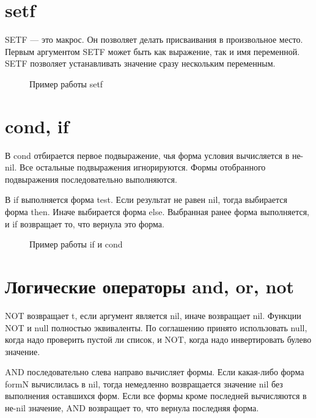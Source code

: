 \section{setf}

SETF — это макрос. Он позволяет делать присваивания в произвольное 
место. Первым аргументом SETF может быть как выражение, так и имя 
переменной. SETF позволяет устанавливать значение сразу нескольким
переменным.

\begin{figure}[H]
    \begin{listingbox}{}
        
    \end{listingbox}
    \caption{Пример работы setf}
    \label{lst:setf-example}
\end{figure}

\section{cond, if}

В cond отбирается первое подвыражение, чья форма условия вычисляется 
в не-nil. Все остальные подвыражения игнорируются. Формы отобранного 
подвыражения последовательно выполняются.

В if выполняется форма test. Если результат не равен nil, 
тогда выбирается форма then. Иначе выбирается форма else. 
Выбранная ранее форма выполняется, и if возвращает то, что 
вернула это форма.

\begin{figure}[H]
    \begin{listingbox}{}
        
    \end{listingbox}
    \caption{Пример работы if и cond}
    \label{lst:if-cond-example}
\end{figure}

\section{Логические операторы and, or, not}

NOT возвращает t, если аргумент является nil, иначе возвращает nil.
Функции NOT и null полностью эквиваленты. По соглашению принято 
использовать null, когда надо проверить пустой ли список, и NOT, 
когда надо инвертировать булево значение.

AND последовательно слева направо вычисляет формы. Если какая-либо 
форма formN вычислилась в nil, тогда немедленно возвращается 
значение nil без выполнения оставшихся форм. Если все формы кроме 
последней вычисляются в не-nil значение, AND возвращает то, что 
вернула последняя форма.

